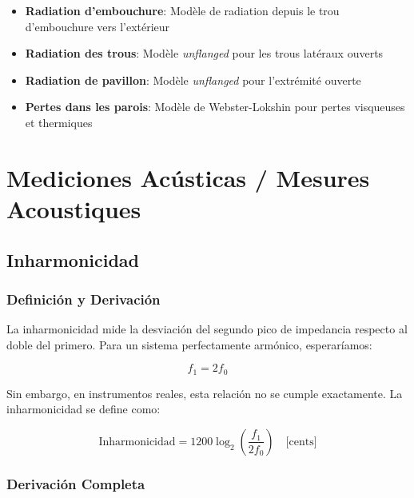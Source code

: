 \documentclass[12pt,a4paper,twocolumn]{article}
\newcommand{\freqzero}{f_0}
\newcommand{\freqone}{f_1}
\begin{document}
\begin{itemize}
    \item \textbf{Radiation d'embouchure}: Modèle de radiation depuis le trou d'embouchure vers l'extérieur
    \item \textbf{Radiation des trous}: Modèle \textit{unflanged} pour les trous latéraux ouverts
    \item \textbf{Radiation de pavillon}: Modèle \textit{unflanged} pour l'extrémité ouverte
    \item \textbf{Pertes dans les parois}: Modèle de Webster-Lokshin pour pertes visqueuses et thermiques
\end{itemize}


\section{Mediciones Acústicas / Mesures Acoustiques}

\subsection{Inharmonicidad}

\subsubsection{Definición y Derivación}

La inharmonicidad mide la desviación del segundo pico de impedancia respecto al doble del primero. Para un sistema perfectamente armónico, esperaríamos:

\begin{equation}
\freqone = 2\freqzero
\end{equation}

Sin embargo, en instrumentos reales, esta relación no se cumple exactamente. La inharmonicidad se define como:

\begin{equation}
\text{Inharmonicidad} = 1200 \log_2\left(\frac{\freqone}{2\freqzero}\right) \quad \text{[cents]}
\label{eq:inharmonicidad}
\end{equation}

\subsubsection{Derivación Completa}
\end{document}
